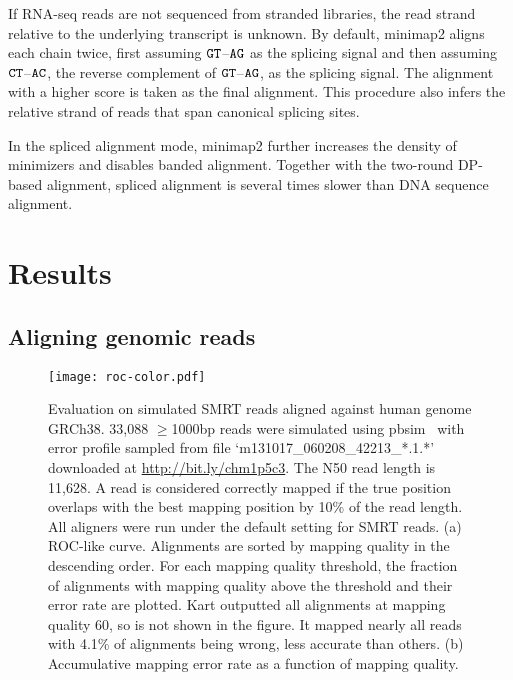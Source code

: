 \documentclass{bioinfo}
\begin{document}
\begin{methods}

If RNA-seq reads are not sequenced from stranded libraries, the read strand
relative to the underlying transcript is unknown. By default, minimap2 aligns
each chain twice, first assuming ${\tt GT}$--${\tt AG}$ as the splicing signal
and then assuming ${\tt CT}$--${\tt AC}$, the reverse complement of ${\tt
GT}$--${\tt AG}$, as the splicing signal. The alignment with a higher score is
taken as the final alignment. This procedure also infers the relative strand of
reads that span canonical splicing sites.

In the spliced alignment mode, minimap2 further increases the density of
minimizers and disables banded alignment. Together with the two-round DP-based
alignment, spliced alignment is several times slower than DNA sequence
alignment.

\end{methods}

\section{Results}

\subsection{Aligning genomic reads}

\begin{figure}[!tb]
\centering
\texttt{[image: roc-color.pdf]}
\caption{Evaluation on simulated SMRT reads aligned against human genome
GRCh38.  33,088 $\ge$1000bp reads were simulated using pbsim~\citep{Ono:2013aa}
with error profile sampled from file `m131017\_060208\_42213\_*.1.*' downloaded
at \href{http://bit.ly/chm1p5c3}{http://bit.ly/chm1p5c3}. The N50 read length
is 11,628. A read is considered correctly mapped if the true position overlaps
with the best mapping position by 10\% of the read length. All aligners were
run under the default setting for SMRT reads.  (a) ROC-like curve. Alignments
are sorted by mapping quality in the descending order. For each mapping quality
threshold, the fraction of alignments with mapping quality above the threshold
and their error rate are plotted.  Kart outputted all alignments at mapping
quality 60, so is not shown in the figure. It mapped nearly all reads with
4.1\% of alignments being wrong, less accurate than others.  (b) Accumulative
mapping error rate as a function of mapping quality.}\label{fig:eval}
\end{figure}
\end{document}
